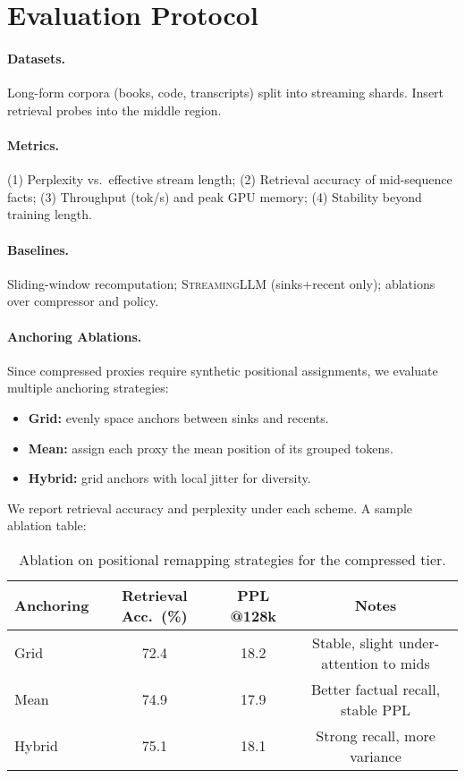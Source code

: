 \documentclass[11pt]{article}
\newcommand{\streaming}{\textsc{StreamingLLM}}
\begin{document}
\section{Evaluation Protocol}

\paragraph{Datasets.}
Long-form corpora (books, code, transcripts) split into streaming shards. Insert retrieval probes into the middle region.

\paragraph{Metrics.}
(1) Perplexity vs.\ effective stream length; (2) Retrieval accuracy of mid-sequence facts; (3) Throughput (tok/s) and peak GPU memory; (4) Stability beyond training length.

\paragraph{Baselines.}
Sliding-window recomputation; \streaming{} (sinks+recent only); ablations over compressor and policy.

\paragraph{Anchoring Ablations.}
Since compressed proxies require synthetic positional assignments, we evaluate multiple anchoring strategies:
\begin{itemize}
  \item \textbf{Grid:} evenly space anchors between sinks and recents.
  \item \textbf{Mean:} assign each proxy the mean position of its grouped tokens.
  \item \textbf{Hybrid:} grid anchors with local jitter for diversity.
\end{itemize}
We report retrieval accuracy and perplexity under each scheme. A sample ablation table:

\begin{table}[h]
\centering
\begin{tabular}{lccc}
\toprule
\textbf{Anchoring} & \textbf{Retrieval Acc.\ (\%)} & \textbf{PPL @128k} & \textbf{Notes} \\
\midrule
Grid     & 72.4 & 18.2 & Stable, slight under-attention to mids \\
Mean     & 74.9 & 17.9 & Better factual recall, stable PPL \\
Hybrid   & 75.1 & 18.1 & Strong recall, more variance \\
\bottomrule
\end{tabular}
\caption{Ablation on positional remapping strategies for the compressed tier.}
\end{table}
\end{document}
